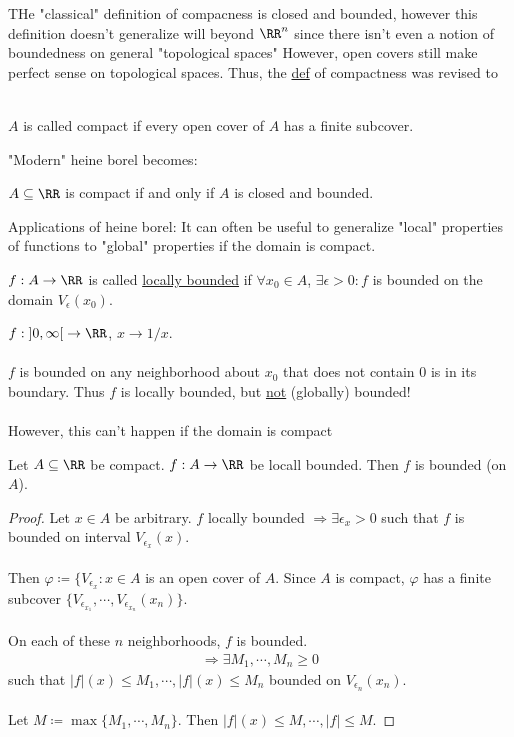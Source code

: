 \documentclass[class=scrartcl, crop=false]{standalone}
\begin{document}
\begin{remark}
  THe "classical" definition of compacness is closed and bounded, however this definition doesn't generalize will beyond $\RR^n$ since there isn't even a notion of boundedness on general "topological spaces" However, open covers still make perfect sense on topological spaces. Thus, the \ul{def} of compactness was revised to
  \\\\
  \begin{definition}
    $A$ is called compact if every open cover of $A$ has a finite subcover.
  \end{definition} 
  "Modern" heine borel becomes:
  \begin{definition}
    $A \subseteq \RR$ is compact if and only if $A$ is closed and bounded.
  \end{definition} 
  Applications of heine borel: It can often be useful to generalize "local" properties of functions to "global" properties if the domain is compact.
  \begin{definition}
    $f : A \to \RR$ is called \ul{locally bounded} if $\forall x_0 \in A$, $\exists \epsilon > 0 : f$ is bounded on the domain $V_\epsilon(x_0)$.
  \end{definition} 
\end{remark} 

\begin{example}
  $f: \left]0, \infty\right[ \to \RR$, $x \to 1 / x$.
  \\\\
  $f$ is bounded on any neighborhood about $x_0$ that does not contain $0$ is in its boundary. Thus $f$ is locally bounded, but \ul{not} (globally) bounded!
  \\\\
  However, this can't happen if the domain is compact
\end{example} 

\begin{theorem}
  Let $A \subseteq \RR$ be compact. $f: A \to \RR$ be locall bounded. Then $f$ is bounded (on $A$).
  \begin{proof}
    Let $x \in A$ be arbitrary. $f$ locally bounded $\Rightarrow \exists \epsilon_x > 0$ such that $f$ is bounded on interval $V_{\epsilon_x}(x)$.
    \\\\
    Then $\varphi \coloneqq \{V_{\epsilon_x} : x \in A$ is an open cover of $A$. Since $A$ is compact, $\varphi$ has a finite subcover $\{V_{\epsilon_{x_1}}, \cdots, V_{\epsilon_{x_n}}(x_n)\}$.
      \\\\
      On each of these $n$ neighborhoods, $f$ is bounded.
      \begin{gather*}
        \Rightarrow \exists M_1, \cdots, M_n \geq 0
      \end{gather*}  such that $|f|(x) \leq M_1, \cdots, |f|(x) \leq M_n$ bounded on $V_{\epsilon_n}(x_n)$.
      \\\\
      Let $M \coloneqq \max\{M_1, \cdots, M_n\}$. Then $|f|(x) \leq M, \cdots, |f| \leq M$.
  \end{proof} 
\end{theorem} 
\end{document}
